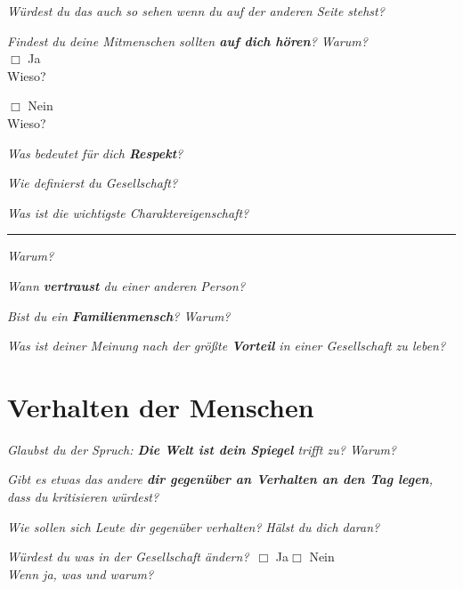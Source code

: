 \documentclass[a4paper,12pt]{scrartcl}
\newcommand{\checkbox}{\(\Box\)}
\newcommand{\hfilloutline}[1]{\rule{#1}{0.5pt}}
\newcommand{\frage}[1]{\textit{#1}}
\renewcommand{\emph}[1]{\textbf{#1}}
\begin{document}
\frage{Würdest du das auch so sehen wenn du auf der anderen Seite stehst?}
\vspace{3cm}

\frage{Findest du deine Mitmenschen sollten \emph{auf dich hören}? Warum?} \\ 
\checkbox{} Ja\\
Wieso?\\
\vspace{1cm}

\checkbox{} Nein\\ 
Wieso?\\
\vspace{1cm}

\frage{Was bedeutet für dich \emph{Respekt}?}
\vspace{3cm}

\frage{Wie definierst du Gesellschaft?}
\vspace{3cm}

\frage{Was ist die wichtigste Charaktereigenschaft?} \hfill\hfilloutline{7.5cm}
\frage{Warum?}
\vspace{2cm}

\newpage
\frage{Wann \emph{vertraust} du einer anderen Person?}
\vspace{3cm}


\frage{Bist du ein \emph{Familienmensch}? Warum?}
\vspace{3cm}

\frage{Was ist deiner Meinung nach der größte \emph{Vorteil} in einer Gesellschaft zu leben?}
\vspace{3cm}




\newpage
\section*{Verhalten der Menschen}

\frage{Glaubst du der Spruch: \emph{Die Welt ist dein Spiegel} trifft zu? Warum?}
\vspace{3cm}

\frage{Gibt es etwas das andere \emph{dir gegenüber an Verhalten an den Tag legen}, dass du kritisieren würdest?}
\vspace{3cm}

\frage{Wie sollen sich Leute dir gegenüber verhalten?}
\frage{Hälst du dich daran?}
\vspace{2cm}


\frage{Würdest du was in der Gesellschaft ändern?}\ \checkbox{} Ja\hspace{0.8cm}\checkbox{} Nein\\
\frage{Wenn ja, was und warum?}
\vspace{3cm}
\end{document}
